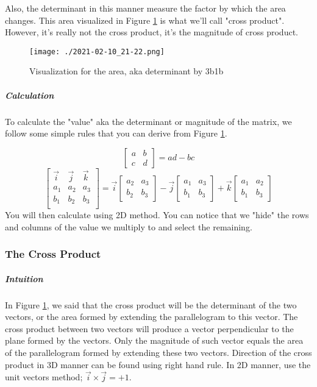 \documentclass{article}
\begin{document}
Also, the determinant in this manner measure the factor by which the area changes. This area visualized in Figure \ref{3b1b:det1} is what we'll call "cross product". However, it's really not the cross product, it's the magnitude of cross product.

\begin{figure}[h]
	\texttt{[image: ./2021-02-10\_21-22.png]}
	\caption{Visualization for the area, aka determinant by 3b1b}
	\label{3b1b:det1}
\end{figure}

\subparagraph{Calculation}
To calculate the "value" aka the determinant or magnitude of the matrix, we follow some simple rules that you can derive from Figure \ref{3b1b:det1}.

\[
	\left [
		\begin{matrix}
			a & b\\c & d
		\end{matrix}
		\right]
	= a d - b c
\]
\[
	\left [
		\begin{matrix}
			\vec{ i } & \vec{ j } & \vec{ k } \\
			a_1 & a_2 & a_3 \\
			b_1 & b_2 & b_3 \\
		\end{matrix}
		\right] = \vec{ i } \left [
		\begin{matrix}
			a_2 & a_3\\
			b_2 & b_3
		\end{matrix}
		\right]
	- \vec{ j } \left [
		\begin{matrix}
			a_1 & a_3\\b_1 & b_3
		\end{matrix}
		\right] + \vec{ k } \left [
		\begin{matrix}
			a_1 & a_2\\b_1 & b_3
		\end{matrix}
		\right]
\]
You will then  calculate using 2D method. You can notice that we "hide" the rows and columns of the value we multiply to and select the remaining.

\subsubsection{The Cross Product}

\subparagraph{Intuition} 

In Figure \ref{3b1b:det1}, we said that the cross product will be the determinant of the two vectors, or the area formed by extending the parallelogram to this vector. The cross product between two vectors will produce a vector perpendicular to the plane formed by the vectors. Only the magnitude of such vector equals the area of the parallelogram formed by extending these two vectors. 
Direction of the cross product in 3D manner can be found using right hand rule. In 2D manner, use the unit vectors method; 
$ \vec{ i } \times \vec{ j } = +1$.
\end{document}
